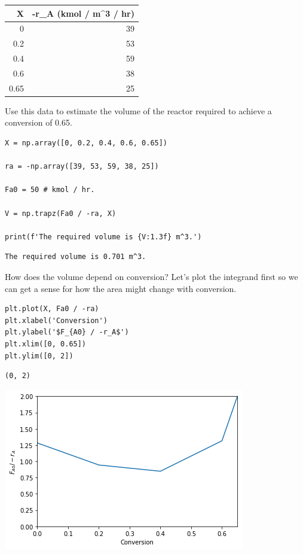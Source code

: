 \documentclass[11pt]{article}
\begin{document}
\begin{enumerate}
\begin{center}
\begin{tabular}{rr}
X & -r\_A (kmol / m\^{}3 / hr)\\
\hline
0 & 39\\
0.2 & 53\\
0.4 & 59\\
0.6 & 38\\
0.65 & 25\\
\end{tabular}
\end{center}

Use this data to estimate the volume of the reactor required to achieve a conversion of 0.65.

\begin{verbatim}
X = np.array([0, 0.2, 0.4, 0.6, 0.65])

ra = -np.array([39, 53, 59, 38, 25])

Fa0 = 50 # kmol / hr.

V = np.trapz(Fa0 / -ra, X)

print(f'The required volume is {V:1.3f} m^3.')
\end{verbatim}

\begin{verbatim}
The required volume is 0.701 m^3.

\end{verbatim}

How does the volume depend on conversion? Let's plot the integrand first so we can get a sense for how the area might change with conversion.

\begin{verbatim}
plt.plot(X, Fa0 / -ra)
plt.xlabel('Conversion')
plt.ylabel('$F_{A0} / -r_A$')
plt.xlim([0, 0.65])
plt.ylim([0, 2])
\end{verbatim}

\begin{verbatim}
(0, 2)
\end{verbatim}



\begin{center}
\includegraphics[width=.9\linewidth]{obipy-resources/d9632b07b477acbf48eabd2bf122330e-1814nA.png}
\end{center}


\end{enumerate}
\end{document}
